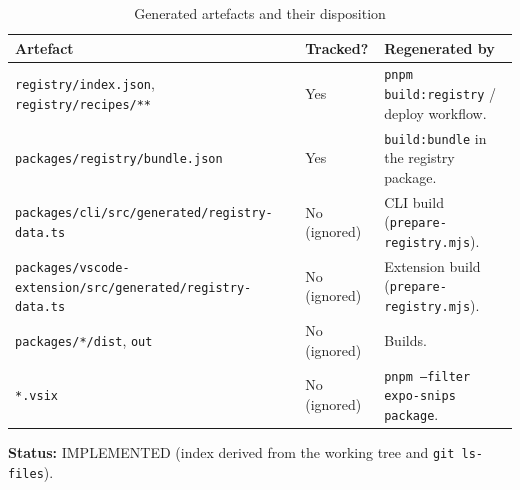 \begin{longtable}{p{6.2cm}p{3cm}p{5.2cm}}
\caption{Generated artefacts and their disposition}\\
\toprule
\textbf{Artefact} & \textbf{Tracked?} & \textbf{Regenerated by} \\
\midrule

\texttt{registry/index.json}, \texttt{registry/recipes/**} & Yes & \texttt{pnpm
build:registry} / deploy workflow. \\
\texttt{packages/registry/bundle.json} & Yes & \texttt{build:bundle} in the registry
package. \\
\texttt{packages/cli/src/generated/registry-data.ts} & No (ignored) & CLI build
(\texttt{prepare-registry.mjs}). \\
\texttt{packages/vscode-extension/src/generated/registry-data.ts} & No (ignored) &
Extension build (\texttt{prepare-registry.mjs}). \\
\texttt{packages/*/dist}, \texttt{out} & No (ignored) & Builds. \\
\texttt{*.vsix} & No (ignored) & \texttt{pnpm --filter expo-snips package}. \\
\bottomrule
\end{longtable}

\textbf{Status:} IMPLEMENTED (index derived from the working tree and
\texttt{git ls-files}).
